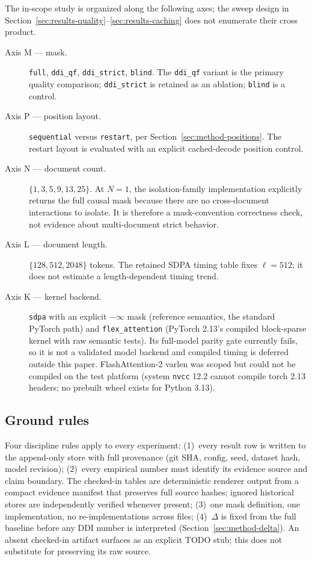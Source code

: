 The in-scope study is organized along the following axes; the sweep
design in
Section~\ref{sec:results-quality}--\ref{sec:results-caching} does not
enumerate their cross product.
\begin{description}
    \item[Axis M --- mask.] \texttt{full}, \texttt{ddi\_qf},
          \texttt{ddi\_strict}, \texttt{blind}. The \texttt{ddi\_qf}
           variant is the primary quality comparison; \texttt{ddi\_strict} is
          retained as an ablation; \texttt{blind} is a control.
    \item[Axis P --- position layout.] \texttt{sequential} versus
          \texttt{restart}, per Section~\ref{sec:method-positions}. The
          restart layout is evaluated with an explicit cached-decode position
          control.
    \item[Axis N --- document count.] $\{1, 3, 5, 9, 13, 25\}$. At $N=1$,
          the isolation-family implementation explicitly returns the full
          causal mask because there are no cross-document interactions to
          isolate. It is therefore a mask-convention correctness check, not
          evidence about multi-document strict behavior.
    \item[Axis L --- document length.] $\{128, 512, 2048\}$ tokens. The
          retained SDPA timing table fixes $\ell=512$; it does not estimate a
          length-dependent timing trend.
    \item[Axis K --- kernel backend.] \texttt{sdpa} with an explicit
          $-\infty$ mask (reference semantics, the standard PyTorch
          path) and \texttt{flex\_attention} (PyTorch 2.13's compiled
           block-sparse kernel with raw semantic tests). Its full-model parity
           gate currently fails, so it is not a validated model backend and
           compiled timing is deferred outside this paper.
           FlashAttention-2 varlen was scoped but
          could not be compiled on the test platform (system \texttt{nvcc}
          12.2 cannot compile torch 2.13 headers; no prebuilt wheel
          exists for Python 3.13).
\end{description}

\subsection{Ground rules}
\label{sec:design-ground-rules}

Four discipline rules apply to every experiment:
(1)~every result row is written to the append-only store with full
provenance (git SHA, config, seed, dataset hash, model revision);
(2)~every empirical number must identify its evidence source and claim
boundary. The checked-in tables are deterministic renderer output from a
compact evidence manifest that preserves full source hashes; ignored historical
stores are independently verified whenever present;
(3)~one mask definition, one implementation, no re-implementations across
files; (4)~$\Delta$ is fixed from the full baseline before any DDI number
is interpreted (Section~\ref{sec:method-delta}). An absent checked-in artifact
surfaces as an explicit TODO stub; this does not substitute for preserving its
raw source.
